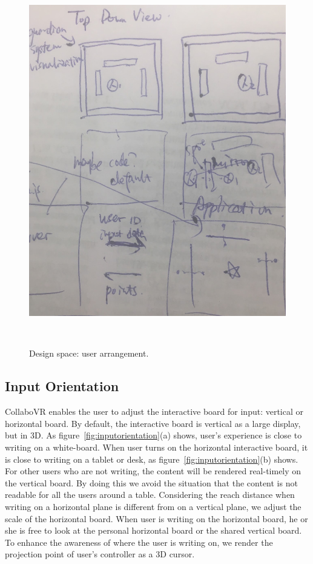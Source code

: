 \documentclass{sigchi}
\begin{document}
\begin{figure}[t!]
 \centering
 \includegraphics[width=0.9\columnwidth]{userarrangement.jpg}
 \caption{Design space: user arrangement.
 }~\label{fig:userarrangement}
\end{figure}

\subsection{Input Orientation}
CollaboVR enables the user to adjust the interactive board for input: vertical or horizontal board. By default, the interactive board is vertical as a large display, but in 3D. As figure~\ref{fig:inputorientation}(a) shows, user's experience is close to writing on a white-board. When user turns on the horizontal interactive board, it is close to writing on a tablet or desk, as figure~\ref{fig:inputorientation}(b) shows. For other users who are not writing, the content will be rendered real-timely on the vertical board. By doing this we avoid the situation that the content is not readable for all the users around a table. Considering the reach distance when writing on a horizontal plane is different from on a vertical plane, we adjust the scale of the horizontal board. When user is writing on the horizontal board, he or she is free to look at the personal horizontal board or the shared vertical board. To enhance the awareness of where the user is writing on, we render the projection point of user's controller as a 3D cursor.
\end{document}
